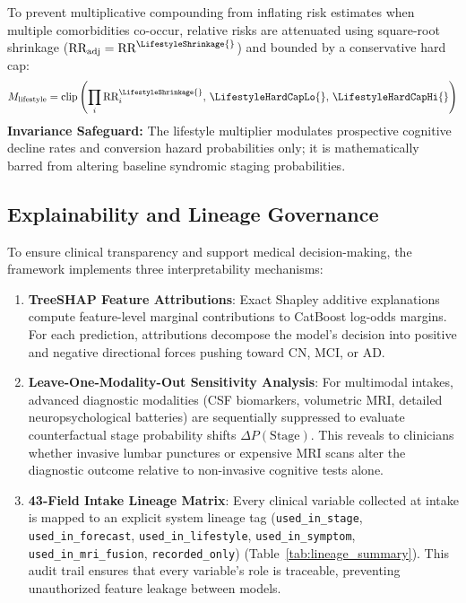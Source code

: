To prevent multiplicative compounding from inflating risk estimates when multiple comorbidities co-occur, relative risks are attenuated using square-root shrinkage ($\text{RR}_{\text{adj}} = \text{RR}^{\LifestyleShrinkage{}}$) and bounded by a conservative hard cap:
\begin{equation}
    M_{\text{lifestyle}} = \text{clip}\left(\prod_{i} \text{RR}_{i}^{\LifestyleShrinkage{}}, \, \LifestyleHardCapLo{}, \, \LifestyleHardCapHi{}\right)
\end{equation}
\textbf{Invariance Safeguard:} The lifestyle multiplier modulates prospective cognitive decline rates and conversion hazard probabilities only; it is mathematically barred from altering baseline syndromic staging probabilities.

\subsection{Explainability and Lineage Governance}
To ensure clinical transparency and support medical decision-making, the framework implements three interpretability mechanisms:
\begin{enumerate}
    \item \textbf{TreeSHAP Feature Attributions}: Exact Shapley additive explanations~\cite{lundberg2017shap} compute feature-level marginal contributions to CatBoost log-odds margins. For each prediction, attributions decompose the model's decision into positive and negative directional forces pushing toward CN, MCI, or AD.
    \item \textbf{Leave-One-Modality-Out Sensitivity Analysis}: For multimodal intakes, advanced diagnostic modalities (CSF biomarkers, volumetric MRI, detailed neuropsychological batteries) are sequentially suppressed to evaluate counterfactual stage probability shifts $\Delta P(\text{Stage})$. This reveals to clinicians whether invasive lumbar punctures or expensive MRI scans alter the diagnostic outcome relative to non-invasive cognitive tests alone.
    \item \textbf{43-Field Intake Lineage Matrix}: Every clinical variable collected at intake is mapped to an explicit system lineage tag (\texttt{used\_in\_stage}, \texttt{used\_in\_forecast}, \texttt{used\_in\_lifestyle}, \texttt{used\_in\_symptom}, \texttt{used\_in\_mri\_fusion}, \texttt{recorded\_only}) (Table~\ref{tab:lineage_summary}). This audit trail ensures that every variable's role is traceable, preventing unauthorized feature leakage between models.
\end{enumerate}


